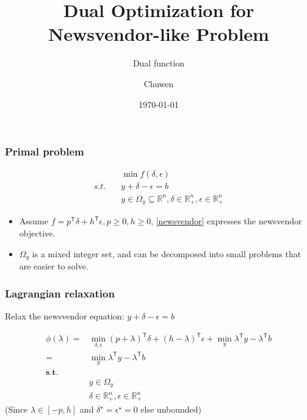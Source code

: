 
\title{Dual Optimization for Newsvendor-like Problem}
\author{Chuwen}
\date{\today}

\usepackage{subfiles}
\usepackage{subfig}

\frame{\titlepage}


\begin{frame}
  \frametitle{Primal problem}

  \begin{align}
                                  & \min f(\delta, \epsilon)                                                                       \\
    \label{newsvendor} s.t. \quad & y + \delta - \epsilon = b                                                                      \\
                                  & y \in \Omega_y \subseteq \mathbb{R}^n, \delta \in \mathbb{R}^n_+ , \epsilon \in \mathbb{R}^n_+
  \end{align}

  \begin{itemize}
    \item Assume \(f=p^\mathsf{T}\delta + h^\mathsf{T}\epsilon, p \ge 0, h \ge 0\), \eqref{newsvendor} expresses the newsvendor objective.
    \item \(\Omega_y\) is a mixed integer set, and can be decomposed into small problems that are easier to solve.
  \end{itemize}
\end{frame}


\begin{frame}
  \frametitle{Lagrangian relaxation}

  Relax the newsvendor equation: \(y + \delta - \epsilon = b\)

  \subtitle{Dual function}
  \begin{equation}\label{eq:dual}
    \begin{aligned}
      \phi(\lambda) = & \min_{\delta, \epsilon} (p + \lambda)^\mathsf{T}\delta + (h - \lambda)^\mathsf{T}\epsilon + \min_y \lambda^\mathsf{T} y - \lambda^\mathsf{T} b \\
      =               & \min_y \lambda^\mathsf{T} y - \lambda^\mathsf{T} b                                                                                             \\
      \mathbf{s.t.}   &                                                                                                                                                \\
                      & y \in \Omega_y                                                                                                                                 \\
                      & \delta \in \mathbb{R}^n_+ , \epsilon \in \mathbb{R}^n_+
    \end{aligned}
  \end{equation}
  (Since \(\lambda \in [-p, h] \) and \(\delta^\star = \epsilon^\star = 0\) else unbounded)

\end{frame}


